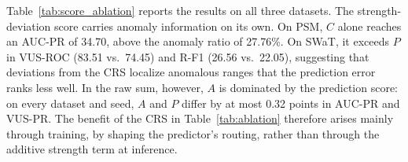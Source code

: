 Table~\ref{tab:score_ablation} reports the results on all three datasets. The
strength-deviation score carries anomaly information on its own. On PSM,
\(C\) alone reaches an AUC-PR of 34.70, above the anomaly ratio of 27.76\%. On
SWaT, it exceeds \(P\) in VUS-ROC (83.51 vs.\ 74.45) and R-F1 (26.56 vs.\ 22.05),
suggesting that deviations from the CRS localize anomalous ranges that the
prediction error ranks less well. In the raw sum, however, \(A\) is dominated by
the prediction score: on every dataset and seed, \(A\) and \(P\) differ by at
most 0.32 points in AUC-PR and VUS-PR. The benefit of the CRS in
Table~\ref{tab:ablation} therefore arises mainly through training, by shaping
the predictor's routing, rather than through the additive strength term at
inference.
